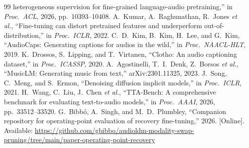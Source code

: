 \documentclass{article}
\begin{document}
{\begin{thebibliography}{99}
heterogeneous supervision for fine-grained language-audio pretraining,'' in \emph{Proc.\ ACL}, 2026,
pp.~10393--10408.
 A.~Kumar, A.~Raghunathan, R.~Jones \emph{et al.}, ``Fine-tuning
can distort pretrained features and underperform out-of-distribution,'' in \emph{Proc.\ ICLR}, 2022.
 C.~D.~Kim, B.~Kim, H.~Lee, and G.~Kim, ``AudioCaps: Generating captions
for audios in the wild,'' in \emph{Proc.\ NAACL-HLT}, 2019.
 K.~Drossos, S.~Lipping, and T.~Virtanen, ``Clotho: An audio captioning dataset,'' in \emph{Proc.\ ICASSP}, 2020.
 A.~Agostinelli, T.~I.~Denk, Z.~Borsos \emph{et al.}, ``MusicLM:
Generating music from text,'' arXiv:2301.11325, 2023.
 J.~Song, C.~Meng, and S.~Ermon, ``Denoising diffusion implicit models,'' in
\emph{Proc.\ ICLR}, 2021.
 H.~Wang, C.~Liu, J.~Chen \emph{et al.}, ``TTA-Bench: A comprehensive benchmark for evaluating text-to-audio models,'' in \emph{Proc.\ AAAI}, 2026, pp.~33512--33520.
 G.~Bibb\'o, A.~Singh, and M.~D.~Plumbley, ``Companion repository for operating-point evaluation of recovery fine-tuning,'' 2026. [Online]. Available: \url{https://github.com/gbibbo/audioldm-modality-swap-pruning/tree/main/paper-operating-point-recovery}
\end{thebibliography}}
\end{document}
